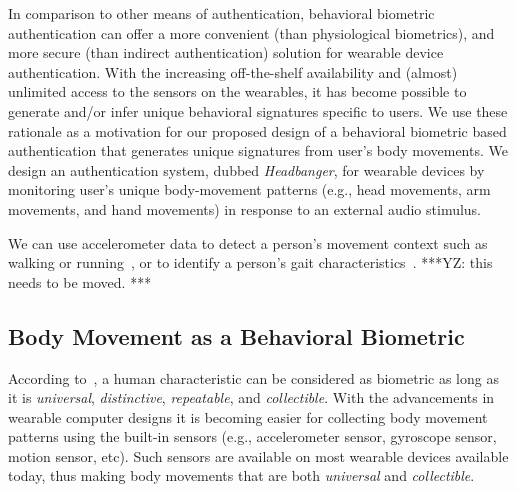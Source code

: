 In comparison to other means of authentication, behavioral biometric
authentication can offer a more convenient (than physiological biometrics),
and more secure (than indirect authentication) solution for wearable device
authentication. With the increasing off-the-shelf
availability and (almost) unlimited access to the sensors on the wearables, it
has become possible to generate and/or infer unique behavioral signatures
specific to users. We use these rationale as a motivation for our proposed
design of a behavioral biometric based authentication that generates unique
signatures from user's body movements.
We design an authentication system, dubbed {\em Headbanger}, for wearable
devices by monitoring user's unique body-movement patterns (e.g., head movements, arm movements, and hand movements) in response to an
external audio stimulus.


We can use accelerometer data to detect a person's movement context such as walking or running~\cite{karantonis2006implementation}, or to identify a person's gait characteristics~\cite{mantyjarvi2005identifying,derawi2010unobtrusive}. ***YZ: this needs to be moved. ***



\subsection{Body Movement as a Behavioral Biometric}
\label{subsec:headmovements}


According to~\cite{jain2004introduction}, a human characteristic can be
considered as biometric as long as it is \emph{universal}, \emph{distinctive},
\emph{repeatable}, and \emph{collectible}. With the advancements in
wearable computer designs it is becoming easier for collecting body movement
patterns using the built-in sensors (e.g., accelerometer sensor, gyroscope sensor, motion sensor, etc). Such sensors are
available on most wearable devices available today, thus
making body movements that are both \emph{universal} and {\em collectible}.

